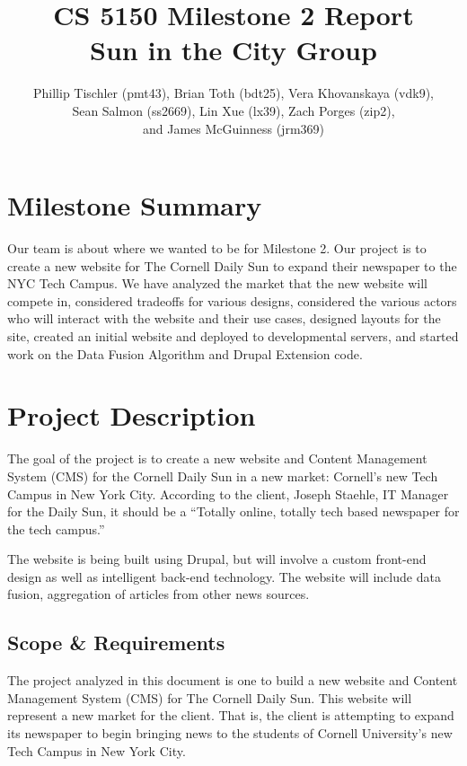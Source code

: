 \documentclass[12pt]{article} %
\title{CS 5150 Milestone 2 Report \\ Sun in the City Group}
\author{Phillip Tischler (pmt43), Brian Toth (bdt25), Vera Khovanskaya (vdk9), \\ 
Sean Salmon (ss2669), Lin Xue (lx39), Zach Porges (zip2),  \\
and James McGuinness (jrm369)}
\begin{document}
\maketitle
\tableofcontents
\clearpage

\section{Milestone Summary}

Our team is about where we wanted to be for Milestone 2. Our project is to create a new website for The Cornell Daily Sun to expand their newspaper to the NYC Tech Campus. We have analyzed the market that the new website will compete in, considered tradeoffs for various designs, considered the various actors who will interact with the website and their use cases, designed layouts for the site, created an initial website and deployed to developmental servers, and started work on the Data Fusion Algorithm and Drupal Extension code. 

\section{Project Description}

The goal of the project is to create a new website and Content Management System (CMS) for the Cornell Daily Sun in a new market: Cornell’s new Tech Campus in New York City. According to the client, Joseph Staehle, IT Manager for the Daily Sun, it should be a ``Totally online, totally tech based newspaper for the tech campus.”

The website is being built using Drupal, but will involve a custom front-end design as well as intelligent back-end technology. The website will include data fusion, aggregation of articles from other news sources.

\subsection{Scope \& Requirements}

The project analyzed in this document is one to build a new website and Content Management System (CMS) for The Cornell Daily Sun. This website will represent a new market for the client. That is, the client is attempting to expand its newspaper to begin bringing news to the students of Cornell University’s new Tech Campus in New York City.
                   
\end{document}
